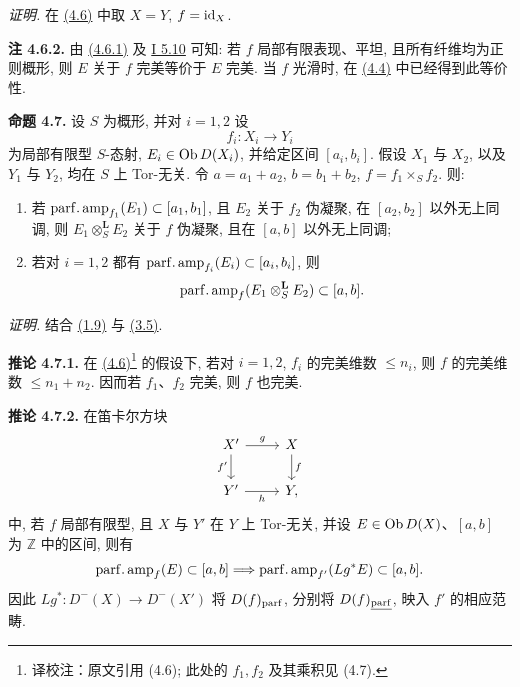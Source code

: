 \emph{证明.} 在 \hyperlink{sga6.e03.prop.4-6}{(4.6)} 中取 \(X=Y\), \(f=\operatorname{id}_X\).

\textbf{注 4.6.2.} 由 \hyperlink{sga6.e03.cor.4-6-1}{(4.6.1)} 及 \hyperlink{sga6.e01.cor.5-10}{I 5.10} 可知: 若 \(f\) 局部有限表现、平坦, 且所有纤维均为正则概形, 则 \(E\) 关于 \(f\) 完美等价于 \(E\) 完美. 当 \(f\) 光滑时, 在 \hyperlink{sga6.e03.prop.4-4}{(4.4)} 中已经得到此等价性.

\textbf{命题 4.7.} 设 \(S\) 为概形, 并对 \(i=1,2\) 设
\[
 f_i:X_i\longrightarrow Y_i
\]
为局部有限型 \(S\)-态射, \(E_i\in\operatorname{Ob} D(X_i)\), 并给定区间 \([a_i,b_i]\). 假设 \(X_1\) 与 \(X_2\), 以及 \(Y_1\) 与 \(Y_2\), 均在 \(S\) 上 Tor-无关. 令 \(a=a_1+a_2\), \(b=b_1+b_2\), \(f=f_1\times_S f_2\). 则:
\begin{enumerate}[label=\alph*)]
\item 若 \(\operatorname{parf.amp}_{f_1}(E_1)\subset[a_1,b_1]\), 且 \(E_2\) 关于 \(f_2\) 伪凝聚, 在 \([a_2,b_2]\) 以外无上同调, 则 \(E_1\otimes_S^{\mathbf L}E_2\) 关于 \(f\) 伪凝聚, 且在 \([a,b]\) 以外无上同调;
\item 若对 \(i=1,2\) 都有 \(\operatorname{parf.amp}_{f_i}(E_i)\subset[a_i,b_i]\), 则
\[
 \operatorname{parf.amp}_f(E_1\otimes_S^{\mathbf L}E_2)
 \subset[a,b].
\]
\end{enumerate}

\emph{证明.} 结合 \hyperlink{sga6.e03.cor.1-9}{(1.9)} 与 \hyperlink{sga6.e03.prop.3-5}{(3.5)}.

\textbf{推论 4.7.1.} 在 \hyperlink{sga6.e03.prop.4-6}{(4.6)}\footnote{译校注：原文引用 (4.6); 此处的 $f_1,f_2$ 及其乘积见 (4.7).} 的假设下, 若对 \(i=1,2\), \(f_i\) 的完美维数 \(\leq n_i\), 则 \(f\) 的完美维数 \(\leq n_1+n_2\). 因而若 \(f_1\)、\(f_2\) 完美, 则 \(f\) 也完美.

\textbf{推论 4.7.2.} 在笛卡尔方块
\[
\begin{tikzcd}
X' \arrow[r,"g"] \arrow[d,"f'"'] & X \arrow[d,"f"]\\
Y' \arrow[r,"h"'] & Y,
\end{tikzcd}
\]
中, 若 \(f\) 局部有限型, 且 \(X\) 与 \(Y'\) 在 \(Y\) 上 Tor-无关, 并设 \(E\in\operatorname{Ob} D(X)\)、\([a,b]\) 为 \(\mathbb Z\) 中的区间, 则有
\[
 \operatorname{parf.amp}_f(E)
 \subset[a,b]
 \Longrightarrow
 \operatorname{parf.amp}_{f'}(Lg^*E)
 \subset[a,b].
\]
因此 \(Lg^*:D^{-}(X)\to D^{-}(X')\) 将 \(D(f)_{\mathrm{parf}}\), 分别将 \(D(f)_{\underline{\mathrm{parf}}}\), 映入 \(f'\) 的相应范畴.

